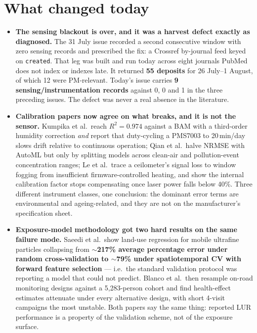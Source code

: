 \documentclass[10pt]{article}
\begin{document}
\vspace{3mm}

\section*{\sffamily\bfseries\color{Deep}What changed today}
\vspace{-1.5mm}{\color{Amber}\rule{\linewidth}{1.1pt}}\vspace{2.5mm}

\footnotesize
\begin{itemize}
\item \textbf{The sensing blackout is over, and it was a harvest defect exactly as
diagnosed.} The 31 July issue recorded a second consecutive window with zero sensing
records and prescribed the fix: a Crossref by-journal feed keyed on \texttt{created}.
That leg was built and run today across eight journals PubMed does not index or indexes
late. It returned \textbf{55 deposits} for 26 July--1 August, of which 12 were
PM-relevant. Today's issue carries \textbf{9 sensing/instrumentation records} against
0, 0 and 1 in the three preceding issues. The defect was never a real absence in the
literature.

\item \textbf{Calibration papers now agree on what breaks, and it is not the sensor.}
Kumpika et al.\ reach $R^2 = 0.974$ against a BAM with a third-order humidity correction
\emph{and} report that duty-cycling a PMS7003 to 20\,min/day slows drift relative to
continuous operation; Qian et al.\ halve NRMSE with AutoML but only by splitting models
across clean-air and pollution-event concentration ranges; Le et al.\ trace a
ceilometer's signal loss to window fogging from insufficient firmware-controlled heating,
and show the internal calibration factor stops compensating once laser power falls below
40\%. Three different instrument classes, one conclusion: the dominant error terms are
environmental and ageing-related, and they are not on the manufacturer's specification
sheet.

\item \textbf{Exposure-model methodology got two hard results on the same failure mode.}
Saeedi et al.\ show land-use regression for mobile ultrafine particles collapsing from
\textbf{$\sim$217\% average percentage error under random cross-validation to
$\sim$79\% under spatiotemporal CV with forward feature selection} --- i.e.\ the standard
validation protocol was reporting a model that could not predict. Blanco et al.\ then
resample on-road monitoring designs against a 5{,}283-person cohort and find
health-effect estimates attenuate under every alternative design, with short 4-visit
campaigns the most unstable. Both papers say the same thing: reported LUR performance is
a property of the validation scheme, not of the exposure surface.


\end{itemize}
\end{document}
